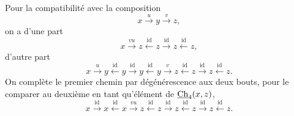 Pour la compatibilité avec la composition
\[
x \xrightarrow{u} y \xrightarrow{v} z,
\]
on a d'une part
\[
x \xrightarrow{vu} z \xleftarrow{\mathrm{id}} z \xrightarrow{\mathrm{id}} z \xleftarrow{\mathrm{id}} z,
\]
d'autre part
\[
x \xrightarrow{u} y \xleftarrow{\mathrm{id}} y \xrightarrow{\mathrm{id}} y \xleftarrow{\mathrm{id}} y \xrightarrow{v} z \xleftarrow{\mathrm{id}} z \xrightarrow{\mathrm{id}} z \xleftarrow{\mathrm{id}} z.
\]
On complète le premier chemin par dégénérescence aux deux bouts, pour le comparer au deuxième en tant qu'élément de $\underline{\mathrm{Ch}}_4(x,z)$,
\[
x \xrightarrow{\mathrm{id}} x \xleftarrow{\mathrm{id}} x \xrightarrow{vu} z \xleftarrow{\mathrm{id}} z \xrightarrow{\mathrm{id}} z \xleftarrow{\mathrm{id}} z \xrightarrow{\mathrm{id}} z \xleftarrow{\mathrm{id}} z.
\]

